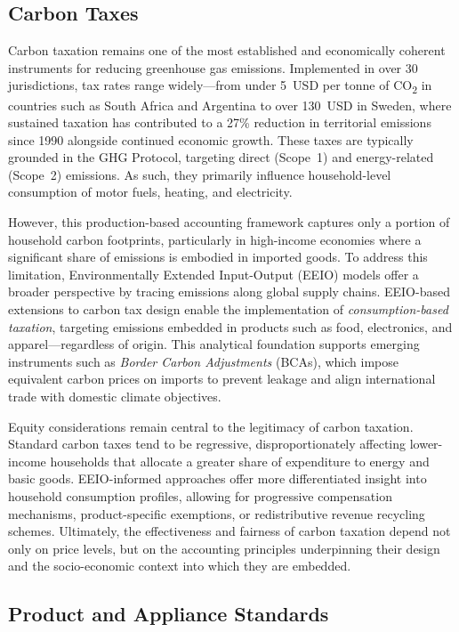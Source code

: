 \documentclass[12pt,a4paper]{article}%
\begin{document}
\subsection{Carbon Taxes}

Carbon taxation remains one of the most established and economically coherent instruments for reducing greenhouse gas emissions. Implemented in over 30 jurisdictions, tax rates range widely---from under 5~USD per tonne of CO\textsubscript{2} in countries such as South Africa and Argentina to over 130~USD in Sweden, where sustained taxation has contributed to a 27\% reduction in territorial emissions since 1990 alongside continued economic growth. These taxes are typically grounded in the GHG Protocol, targeting direct (Scope~1) and energy-related (Scope~2) emissions. As such, they primarily influence household-level consumption of motor fuels, heating, and electricity.

However, this production-based accounting framework captures only a portion of household carbon footprints, particularly in high-income economies where a significant share of emissions is embodied in imported goods. To address this limitation, Environmentally Extended Input-Output (EEIO) models offer a broader perspective by tracing emissions along global supply chains. EEIO-based extensions to carbon tax design enable the implementation of \textit{consumption-based taxation}, targeting emissions embedded in products such as food, electronics, and apparel---regardless of origin. This analytical foundation supports emerging instruments such as \textit{Border Carbon Adjustments} (BCAs), which impose equivalent carbon prices on imports to prevent leakage and align international trade with domestic climate objectives.

Equity considerations remain central to the legitimacy of carbon taxation. Standard carbon taxes tend to be regressive, disproportionately affecting lower-income households that allocate a greater share of expenditure to energy and basic goods. EEIO-informed approaches offer more differentiated insight into household consumption profiles, allowing for progressive compensation mechanisms, product-specific exemptions, or redistributive revenue recycling schemes. Ultimately, the effectiveness and fairness of carbon taxation depend not only on price levels, but on the accounting principles underpinning their design and the socio-economic context into which they are embedded.


\subsection{Product and Appliance Standards}
\end{document}
